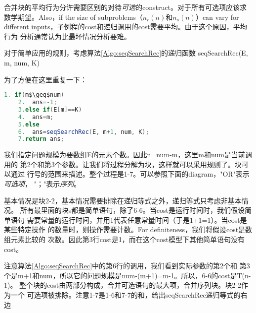合并块的平均行为分许需要区别的对待\emph{可选}的construct。对于所有可选项应该求
数学期望。Also，if the size of subproblems（$n_r(n)$和$n_s(n)$）can vary for
different inputs，子例程的cost和递归调用的cost需要平均。由于这个原因，平均行为
分析通常认为比最坏情况分析要难。

\begin{example}\mbox{}\par
对于简单应用的规则，考虑算法\ref{Algo:seqSearchRec}的递归函数
seqSearchRec(E, m, num, K)

为了方便在这里重复一下：
\begin{lstlisting}[language={Java}, keywordstyle=\color{blue!70}, commentstyle=\color{red!50!green!50!blue!50}]
    1. if(m$\geq$num)
    2.  ans=-1;
    3.else if(E[m]==K)
    4.  ans=m;
    5.else
    6.  ans=seqSearchRec(E, m+1, num, K);
    7.return ans;
\end{lstlisting}

我们指定问题规模为要数组E的元素个数。因此n=num-m，这里m和num是当前调用的
第2个和第3个参数。让我们将过程分解为块，这样就可以采用规则了。块可以通过
行号的范围来描述。整个过程是1-7。可以参照下面的diagram，"OR"表示\emph{可选项}，
"；"表示\emph{序列}。

\begin{center}
\end{center}


基本情况是块2-2，基本情况需要排除在递归等式之外，递归等式只考虑非基本情况。
所有最里面的块s都是简单语句，除了6-6。当cost是运行时间时，我们假设简单语句
需要常量的运行时间，并用1代表任意常量时间（于是1+1=1）。当cost是某些特定操作
的数量时，则操作需要计数。For definiteness，我们将假设cost是数组元素比较的
次数。因此第3行cost是1，而在这个cost模型下其他简单语句没有cost。

注意算法\ref{Algo:seqSearchRec}中的第6行的调用，我们看到实际参数的第2个和
第3个是m+1和num，所以它的问题规模是num-(m+1)=m-1。所以，6-6的cost是T(n-1)。
整个块的cost由两部分构成，合并可选语句的最大项，合并序列块。块2-2作为一个
可选项被排除。注意1-7是1-6和7-7的和，给出seqSearchRec递归等式的右边
\end{example}

